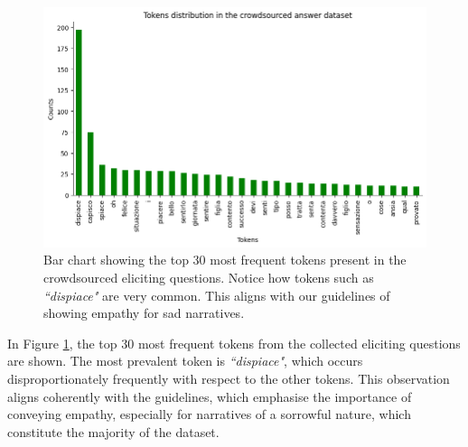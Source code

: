 \begin{figure}[!htbp]
    \centering
    \includegraphics[width=1\linewidth]{assets//imgs/dataset-top-30-answers.png}
    \caption{Bar chart showing the top 30 most frequent tokens present in the crowdsourced eliciting questions. Notice how tokens such as \emph{``dispiace"} are very common. This aligns with our guidelines of showing empathy for sad narratives. }
    \label{fig:dataset-top-30-answers}
\end{figure}

In Figure \ref{fig:dataset-top-30-answers}, the top 30 most frequent tokens from the collected eliciting questions are shown. The most prevalent token is \emph{``dispiace"}, which occurs disproportionately frequently with respect to the other tokens. This observation aligns coherently with the guidelines, which emphasise the importance of conveying empathy, especially for narratives of a sorrowful nature, which constitute the majority of the dataset.

